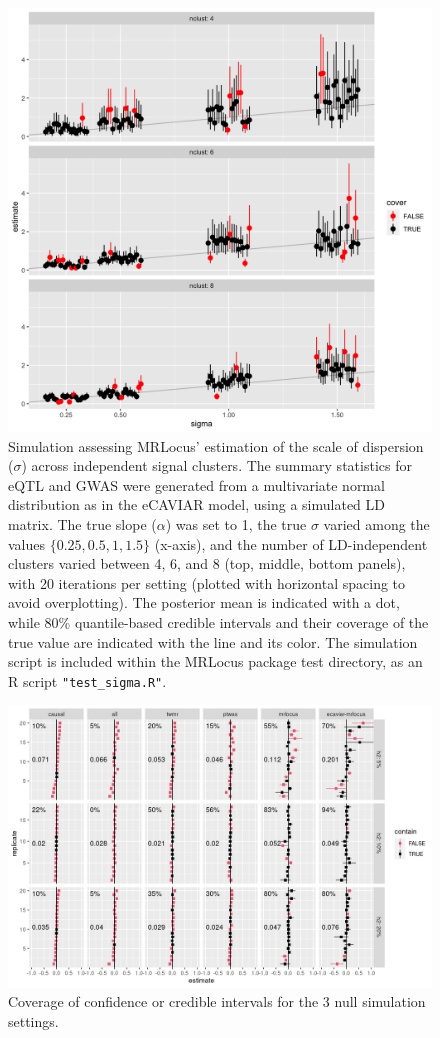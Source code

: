 \documentclass[11pt]{article}
\begin{document}
\begin{figure}[!ht]
  \centering
  \includegraphics[width=.7\textwidth]{figs/sigma_est.png}
  \caption{Simulation assessing MRLocus' estimation of the scale of
    dispersion ($\sigma$) across independent signal clusters. The
    summary statistics for eQTL and GWAS were generated from a
    multivariate normal distribution as in the eCAVIAR model, using a
    simulated LD matrix. The true slope ($\alpha$) was set to 1, the
    true $\sigma$ varied among the values $\{0.25, 0.5, 1, 1.5\}$
    (x-axis), and the number of LD-independent clusters varied between
    4, 6, and 8 (top, middle, bottom panels), with 20 iterations
    per setting (plotted with horizontal spacing to avoid
    overplotting).  The posterior mean is indicated with a dot, while
    80\% quantile-based credible intervals and their coverage of the
    true value are indicated with the line and its color. The
    simulation script is included within the MRLocus package test
    directory, as an R script \texttt{"test\_sigma.R"}.}
\end{figure}

\begin{figure}[!ht]
  \centering
  \includegraphics[width=\textwidth]{figs/nullplot.png}
  \caption{Coverage of confidence or credible intervals for the 3 null
    simulation settings.}
\end{figure}
\end{document}
